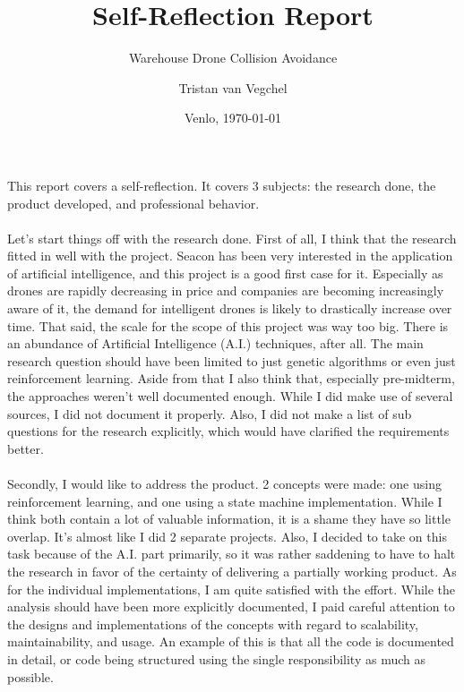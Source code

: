 


\title{Self-Reflection Report}
\subtitle{Warehouse Drone Collision Avoidance}
\author{Tristan van Vegchel}

\date{Venlo, \today}



\maketitle


\noindent
This report covers a self-reflection. It covers 3 subjects: the research done, the product developed, and professional behavior.
\\\\
Let's start things off with the research done. First of all, I think that the research fitted in well with the project. Seacon has been very interested in the application of artificial intelligence, and this project is a good first case for it. Especially as drones are rapidly decreasing in price and companies are becoming increasingly aware of it, the demand for intelligent drones is likely to drastically increase over time. That said, the scale for the scope of this project was way too big. There is an abundance of Artificial Intelligence (A.I.) techniques, after all. The main research question should have been limited to just genetic algorithms or even just reinforcement learning. Aside from that I also think that, especially pre-midterm, the approaches weren't well documented enough. While I did make use of several sources, I did not document it properly. Also, I did not make a list of sub questions for the research explicitly, which would have clarified the requirements better.
\\\\
Secondly, I would like to address the product. 2 concepts were made: one using reinforcement learning, and one using a state machine implementation. While I think both contain a lot of valuable information, it is a shame they have so little overlap. It's almost like I did 2 separate projects. Also, I decided to take on this task because of the A.I. part primarily, so it was rather saddening to have to halt the research in favor of the certainty of delivering a partially working product. As for the individual implementations, I am quite satisfied with the effort. While the analysis should have been more explicitly documented, I paid careful attention to the designs and implementations of the concepts with regard to scalability, maintainability, and usage. An example of this is that all the code is documented in detail, or code being structured using the single responsibility as much as possible.
